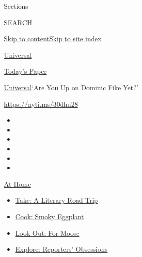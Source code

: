 Sections

SEARCH

\protect\hyperlink{site-content}{Skip to
content}\protect\hyperlink{site-index}{Skip to site index}

\href{https://www.nytimes3xbfgragh.onion/}{Universal}

\href{https://myaccount.nytimes3xbfgragh.onion/auth/login?response_type=cookie\&client_id=vi}{}

\href{https://www.nytimes3xbfgragh.onion/section/todayspaper}{Today's
Paper}

\href{/}{Universal}\textbar{}`Are You Up on Dominic Fike Yet?'

\url{https://nyti.ms/30dhu28}

\begin{itemize}
\item
\item
\item
\item
\item
\item
\end{itemize}

\href{https://www.nytimes3xbfgragh.onion/spotlight/at-home?action=click\&pgtype=Article\&state=default\&region=TOP_BANNER\&context=at_home_menu}{At
Home}

\begin{itemize}
\tightlist
\item
  \href{https://www.nytimes3xbfgragh.onion/2020/07/28/books/time-for-a-literary-road-trip.html?action=click\&pgtype=Article\&state=default\&region=TOP_BANNER\&context=at_home_menu}{Take:
  A Literary Road Trip}
\item
  \href{https://www.nytimes3xbfgragh.onion/2020/07/29/magazine/bored-with-your-home-cooking-some-smoky-eggplant-will-fix-that.html?action=click\&pgtype=Article\&state=default\&region=TOP_BANNER\&context=at_home_menu}{Cook:
  Smoky Eggplant}
\item
  \href{https://www.nytimes3xbfgragh.onion/2020/07/27/travel/moose-michigan-isle-royale.html?action=click\&pgtype=Article\&state=default\&region=TOP_BANNER\&context=at_home_menu}{Look
  Out: For Moose}
\item
  \href{https://www.nytimes3xbfgragh.onion/interactive/2020/at-home/even-more-reporters-editors-diaries-lists-recommendations.html?action=click\&pgtype=Article\&state=default\&region=TOP_BANNER\&context=at_home_menu}{Explore:
  Reporters' Obsessions}
\end{itemize}

